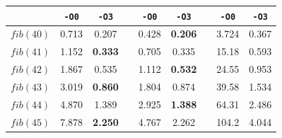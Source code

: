 \begin{table}
{\begin{minipage}{0.7\textwidth}
\begin{tabular}{@{}lcccccccc@{}}
                \cmidrule{2-3} \cmidrule{5-6} \cmidrule{8-9}
                          & \texttt{-O0}                & \texttt{-O3}   &                       & \texttt{-O0} & \texttt{-O3}                &  & \texttt{-O0} & \texttt{-O3} \\ \midrule
                $fib(40)$ & 0.713                       & 0.207          &                       & 0.428        & \textbf{0.206}              &  & 3.724        & 0.367        \\
                $fib(41)$ & 1.152                       & \textbf{0.333} &                       & 0.705        & 0.335                       &  & 15.18        & 0.593        \\
                $fib(42)$ & 1.867                       & 0.535          &                       & 1.112        & \textbf{0.532}              &  & 24.55        & 0.953        \\
                $fib(43)$ & 3.019                       & \textbf{0.860} &                       & 1.804        & 0.874                       &  & 39.58        & 1.534        \\
                $fib(44)$ & 4.870                       & 1.389          &                       & 2.925        & \textbf{1.388}              &  & 64.31        & 2.486        \\
                $fib(45)$ & 7.878                       & \textbf{2.250} &                       & 4.767        & 2.262                       &  & 104.2        & 4.044        \\
                \bottomrule
            \end{tabular}%
        \end{minipage}%
    }%
\end{table}


